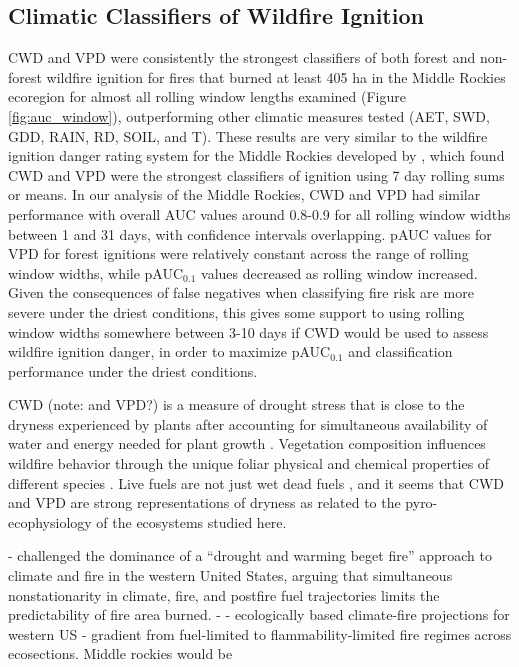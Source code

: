 \documentclass[11pt]{article}
\begin{document}
\subsection{Climatic Classifiers of Wildfire Ignition}
CWD and VPD were consistently the strongest classifiers of both forest and non-forest wildfire ignition for fires that burned at least 405 ha in the Middle Rockies ecoregion for almost all rolling window lengths examined (Figure \ref{fig:auc_window}), outperforming other climatic measures tested (AET, SWD, GDD, RAIN, RD, SOIL, and T).  These results are very similar to the wildfire ignition danger rating system for the Middle Rockies developed by , which found CWD and VPD were the strongest classifiers of ignition using 7 day rolling sums or means.  In our analysis of the Middle Rockies, CWD and VPD had similar performance with overall AUC values around 0.8-0.9 for all rolling window widths between 1 and 31 days, with confidence intervals overlapping.  pAUC values for VPD for forest ignitions were relatively constant across the range of rolling window widths, while pAUC$_{0.1}$ values decreased as rolling window increased.  Given the consequences of false negatives when classifying fire risk are more severe under the driest conditions, this gives some support to using rolling window widths somewhere between 3-10 days if CWD would be used to assess wildfire ignition danger, in order to maximize pAUC$_{0.1}$ and classification performance under the driest conditions.

CWD (note: and VPD?) is a measure of drought stress that is close to the dryness experienced by plants after accounting for simultaneous availability of water and energy needed for plant growth \citep{stephensonActualEvapotranspirationDeficit1998}. Vegetation composition influences wildfire behavior through the unique foliar physical and chemical properties of different species \citep{mattjollySeasonalVariationsRed2016}. Live fuels are not just wet dead fuels \citep{jollyPyroEcophysiologyShiftingParadigm2018}, and it seems that CWD and VPD are strong representations of dryness as related to the pyro-ecophysiology of the ecosystems studied here.

- \citet{littellClimateChangeFuture2018} challenged the dominance of a “drought and warming beget fire” approach to climate and fire in the western United States, arguing that simultaneous nonstationarity in climate, fire, and postfire fuel trajectories limits the predictability of fire area burned.
- \citet{littellClimateChangeFuture2018} - ecologically based climate-fire projections for western US - gradient from fuel-limited to flammability-limited fire regimes across ecosections.  Middle rockies would be 
\end{document}
